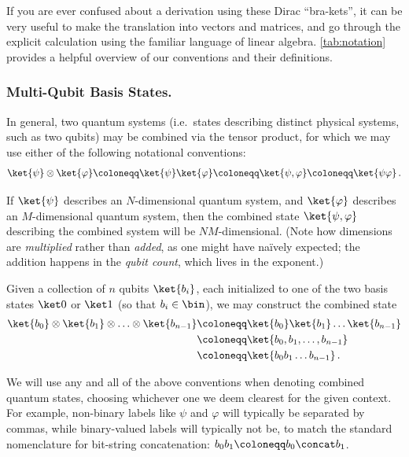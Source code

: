       If you are ever confused about a derivation using these Dirac
        ``bra-kets'', it can be very useful to make the translation into vectors
        and matrices, and go through the
        explicit calculation using the familiar language of linear algebra.
        \cref{tab:notation} provides a helpful overview of our conventions and
        their definitions.
      
    \subsubsection{Multi-Qubit Basis States.}
      In general, two quantum systems (i.e.\ states describing 
        distinct physical systems, such as two qubits) may be combined via the
        tensor product, for which we may use either of the following notational
        conventions:
        \[
          \ket{\psi} \otimes \ket{\varphi} \coloneqq \ket{\psi}\ket{\varphi}
          \coloneqq \ket{\psi, \varphi} \coloneqq \ket{\psi\varphi}\, .
        \]
  
      \noindent
      If $\ket{\psi}$ describes an $N$-dimensional quantum system, and
        $\ket{\varphi}$ describes an $M$-dimensional quantum system, then the
        combined state $\ket{\psi, \varphi}$ describing the combined system will be
        $NM$-dimensional. (Note how dimensions are \emph{multiplied} rather
        than \emph{added}, as one might have na\"ively expected; the addition
        happens in the \emph{qubit count}, which lives in the exponent.)
  
      Given a collection of $n$ qubits $\ket{b_i}$, each initialized to
        one of the two basis states $\ket0$ or $\ket1$ (so that $b_i \in \bin$), we may construct
        the combined state 
        \begin{align*}
          \ket{b_0} \otimes \ket{b_1} \otimes \ldots \otimes \ket{b_{n-1}}
          &\coloneqq \ket{b_0} \ket{b_1} \ldots \ket{b_{n-1}} \\
          &\coloneqq \ket{b_0, b_1, \ldots, b_{n-1}} \\
          &\coloneqq \ket{b_0 b_1 \ldots b_{n-1}}\, .
        \end{align*}

      \noindent
      We will use any and all of the above conventions when denoting combined quantum
        states, choosing whichever one we deem clearest 
        for the given context. For example, non-binary labels like $\psi$ and
        $\varphi$ will typically be separated by commas, while binary-valued labels will
        typically not be, to match the standard nomenclature for bit-string
        concatenation: $b_0 b_1 \coloneqq b_0 \concat b_1$.

